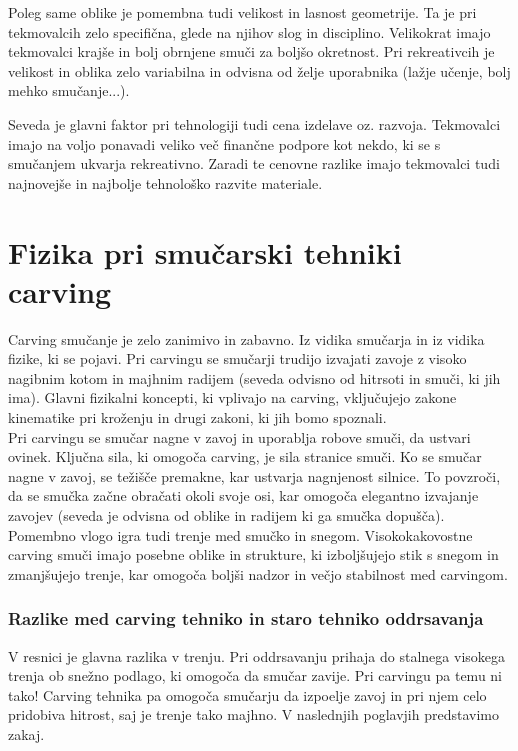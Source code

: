 \documentclass{article}
\begin{document}
Poleg same oblike je pomembna tudi velikost in lasnost geometrije. Ta je pri tekmovalcih zelo specifična, glede na njihov slog in disciplino.
Velikokrat imajo tekmovalci krajše in bolj obrnjene smuči za boljšo okretnost.
Pri rekreativcih je velikost in oblika zelo variabilna in odvisna od želje uporabnika (lažje učenje, bolj mehko smučanje...).

Seveda je glavni faktor pri tehnologiji tudi cena izdelave oz. razvoja. Tekmovalci imajo na voljo ponavadi veliko več finančne podpore kot nekdo, ki se s smučanjem ukvarja rekreativno.
Zaradi te cenovne razlike imajo tekmovalci tudi najnovejše in najbolje tehnološko razvite materiale.
\pagebreak

\section{Fizika pri smučarski tehniki carving}

Carving smučanje je zelo zanimivo in zabavno. Iz vidika smučarja in iz vidika fizike, ki se pojavi.
Pri carvingu se smučarji trudijo izvajati zavoje z visoko nagibnim kotom in majhnim radijem (seveda odvisno od hitrsoti in smuči, ki jih ima). 
Glavni fizikalni koncepti, ki vplivajo na carving, vključujejo zakone kinematike pri kroženju in drugi zakoni, ki jih bomo spoznali. \\ \newline
Pri carvingu se smučar nagne v zavoj in uporablja robove smuči, da ustvari ovinek. Ključna sila, 
ki omogoča carving, je sila stranice smuči. Ko se smučar nagne v zavoj, se težišče premakne, kar ustvarja nagnjenost silnice. 
To povzroči, da se smučka začne obračati okoli svoje osi, kar omogoča elegantno izvajanje zavojev (seveda je odvisna od oblike in radijem ki ga smučka dopušča).\\ \newline
Pomembno vlogo igra tudi trenje med smučko in snegom. Visokokakovostne carving smuči imajo posebne oblike in strukture, 
ki izboljšujejo stik s snegom in zmanjšujejo trenje, kar omogoča boljši nadzor in večjo stabilnost med carvingom.

\subsubsection*{Razlike med carving tehniko in staro tehniko oddrsavanja}

V resnici je glavna razlika v trenju. Pri oddrsavanju prihaja do stalnega visokega trenja ob snežno podlago, ki omogoča da smučar zavije.
Pri carvingu pa temu ni tako! Carving tehnika pa omogoča smučarju da izpoelje zavoj in pri njem celo pridobiva hitrost, saj je trenje tako majhno. 
V naslednjih poglavjih predstavimo zakaj.
\end{document}
